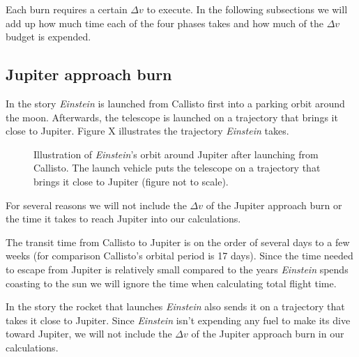 \documentclass[12pt]{article} %
\begin{document}
Each burn requires a certain $\Delta v$ to execute. In the following subsections we will add up how much time each of the four phases takes and how much of the $\Delta v$ budget is expended.

\subsection{Jupiter approach burn}
In the story \textit{Einstein} is launched from Callisto first into a parking orbit around the moon. Afterwards, the telescope is launched on a trajectory that brings it close to Jupiter. Figure X illustrates the trajectory \textit{Einstein} takes.

\begin{figure}[H]
	\caption{Illustration of \textit{Einstein}'s orbit around Jupiter after launching from Callisto. The launch vehicle puts the telescope on a trajectory that brings it close to Jupiter (figure not to scale).}
\end{figure}

For several reasons we will not include the $\Delta v$ of the Jupiter approach burn or the time it takes to reach Jupiter into our calculations.

The transit time from Callisto to Jupiter is on the order of several days to a few weeks (for comparison Callisto's orbital period is 17 days). Since the time needed to escape from Jupiter is relatively small compared to the years \textit{Einstein} spends coasting to the sun we will ignore the time when calculating total flight time.

In the story the rocket that launches \textit{Einstein} also sends it on a trajectory that takes it close to Jupiter. Since \textit{Einstein} isn't expending any fuel to make its dive toward Jupiter, we will not include the $\Delta v$ of the Jupiter approach burn in our calculations.
\end{document}
